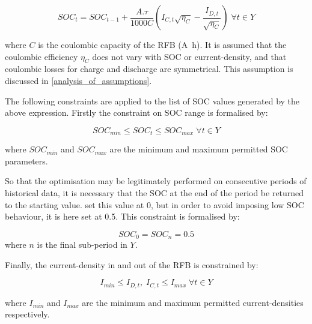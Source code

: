 \documentclass[preprint,3p,review,authoryear,10pt]{elsarticle}
\begin{document}
\begin{equation}
\label{eqn: Method_SOC_Tracker}
SOC_t = SOC_{t-1} + \frac{A.\tau}{1000C}(I_{C,t}\sqrt{\eta_C} - \frac{I_{D,t}}{\sqrt{\eta_C}}) \; \forall t \in Y
\end{equation}

where $C$ is the coulombic capacity of the RFB (\si{\ampere\hour}). It is assumed that the coulombic efficiency $\eta_C$ does not vary with SOC or current-density, and that coulombic losses for charge and discharge are symmetrical. This assumption is discussed in \cref{analysis_of_assumptions}. 

The following constraints are applied to the list of SOC values generated by the above expression. Firstly the constraint on SOC range is formalised by:

\begin{equation}
\label{eqn: Method_Constraint_SOC_Range}
SOC_{min} \leq SOC_t \leq SOC_{max} \; \forall t \in Y
\end{equation}

where $SOC_{min}$ and $SOC_{max}$ are the minimum and maximum permitted SOC parameters.

So that the optimisation may be legitimately performed on consecutive periods of historical data, it is necessary that the SOC at the end of the period be returned to the starting value. \cite{Hu2010} set this value at 0, but in order to avoid imposing low SOC behaviour, it is here set at 0.5. This constraint is formalised by:

\begin{equation}
\label{eqn: Method_Constraint_E_Conservation}
SOC_0 = SOC_n = 0.5
\end{equation}
where $n$ is the final sub-period in $Y$.

Finally, the current-density in and out of the RFB is constrained by:

\begin{equation}
\label{eqn: Method_Constraint_Ia}
I_{min} \leq I_{D,t}, \; I_{C,t} \leq I_{max} \; \forall t \in Y
\end{equation}

where $I_{min}$ and $I_{max}$ are the minimum and maximum permitted current-densities respectively.
\end{document}
